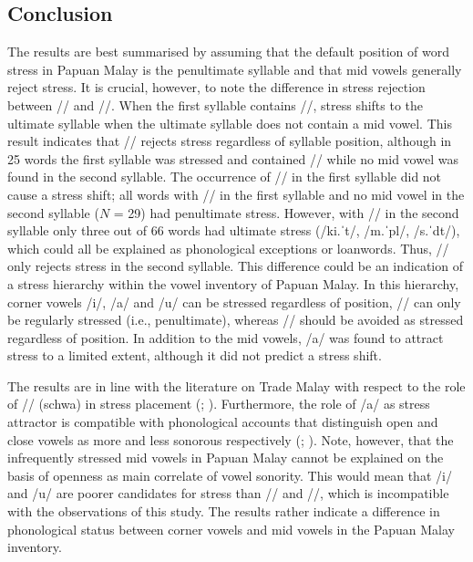 \subsection{Conclusion}
The results are best summarised by assuming that the default position of word stress in Papuan Malay is the penultimate syllable and that mid vowels generally reject stress. It is crucial, however, to note the difference in stress rejection between // and //. When the first syllable contains //, stress shifts to the ultimate syllable when the ultimate syllable does not contain a mid vowel. This result indicates that // rejects stress regardless of syllable position, although in 25 words the first syllable was stressed and contained // while no mid vowel was found in the second syllable. The occurrence of // in the first syllable did not cause a stress shift; all words with // in the first syllable and no mid vowel in the second syllable ($N$ = 29) had penultimate stress. However, with // in the second syllable only three out of 66 words had ultimate stress (/ki.ˈt/, /m.ˈpl/, /s.ˈdt/), which could all be explained as phonological exceptions or loanwords. Thus, // only rejects stress in the second syllable. This difference could be an indication of a stress hierarchy within the vowel inventory of Papuan Malay. In this hierarchy, corner vowels /i/, /a/ and /u/ can be stressed regardless of position, // can only be regularly stressed (i.e., penultimate), whereas // should be avoided as stressed regardless of position. In addition to the mid vowels, /a/ was found to attract stress to a limited extent, although it did not predict a stress shift.\par

The results are in line with the literature on Trade Malay with respect to the role of // (schwa) in stress placement (\citealt{kluge_grammar_2017}; \citealt{paauw_malay_2009}). Furthermore, the role of /a/ as stress attractor is compatible with phonological accounts that distinguish open and close vowels as more and less sonorous respectively (\citealt{kenstowicz_quality-sensitive_1997}; \citealt{selkirk_major_1984}). Note, however, that the infrequently stressed mid vowels in Papuan Malay cannot be explained on the basis of openness as main correlate of vowel sonority. This would mean that /i/ and /u/ are poorer candidates for stress than // and //, which is incompatible with the observations of this study. The results rather indicate a difference in phonological status between corner vowels and mid vowels in the Papuan Malay inventory.\par

